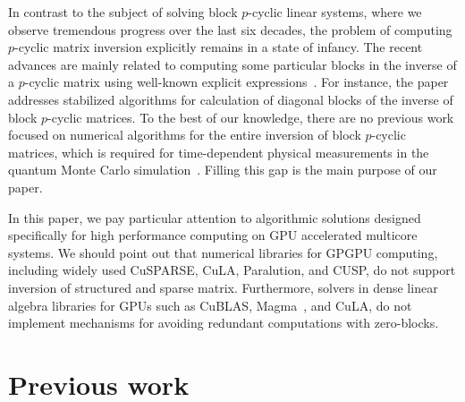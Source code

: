 \documentclass{llncs}
\newcommand{\Blas}{{\sc BLAS}\xspace}
\newcommand{\CuBlas}{{\sc Cu\Blas}\xspace}
\newcommand{\CuSparse}{{\sc CuSPARSE}\xspace}
\newcommand{\Magma}{{\sc Magma}\xspace}
\newcommand{\Cula}{{\sc CuLA}\xspace}
\newcommand{\Paralution}{{\sc Paralution}\xspace}
\newcommand{\Cusp}{{\sc CUSP}\xspace}
\begin{document}
In contrast to the subject of solving block $p$-cyclic linear systems, 
where we observe tremendous progress over the last six decades,
the problem of computing $p$-cyclic matrix inversion explicitly remains in 
a state of infancy. The recent advances are mainly related to 
computing some particular blocks in the inverse of a $p$-cyclic matrix
using well-known explicit expressions~\cite{Bai09,Tomas12}.
For instance, the paper~\cite{Tomas12} addresses stabilized algorithms for 
calculation of diagonal blocks of the inverse of block $p$-cyclic matrices. 
To the best of our knowledge, there are no previous work 
focused on numerical algorithms for the entire inversion of 
block $p$-cyclic matrices, which is required for 
time-dependent physical measurements in the quantum Monte Carlo 
simulation~\cite{Bai09}.
Filling this gap is the main purpose of our paper. 

In this paper, we pay particular attention to 
algorithmic solutions designed specifically for high performance computing 
on GPU accelerated multicore systems.
We should point out that numerical libraries for GPGPU computing,
including widely used 
\CuSparse, %
\Cula, %
\Paralution, %
and \Cusp, %
do not support inversion of structured and sparse matrix.
Furthermore, solvers in dense linear algebra libraries for GPUs 
such as \CuBlas, %
\Magma~\cite{Tomov10Magma}, %
and \Cula, %
do not implement mechanisms for avoiding redundant 
computations with zero-blocks.

\section{Previous work} 
\label{sec:background}
\end{document}
